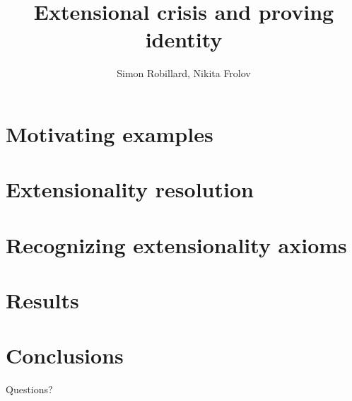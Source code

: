 \documentclass[14pt]{beamer}
\title{Extensional crisis and proving identity}
\author{Simon Robillard, Nikita Frolov}
\institute{}
\date{}
\begin{document}
\begin{frame}
  \maketitle
\end{frame}

\section{Motivating examples}


\section{Extensionality resolution}


\section{Recognizing extensionality axioms}


\section{Results}


\section{Conclusions}


\begin{frame}
  \begin{center}
    \Huge{Questions?}
  \end{center}
\end{frame}
\end{document}
